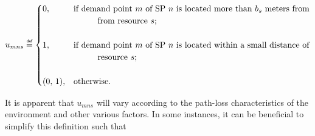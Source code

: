 \documentclass[12pt,dvipsnames]{report}
\newcommand\defeq{\mathrel{\overset{\makebox[0pt]{\mbox{\normalfont\tiny\sffamily def}}}{=}}}
\newcommand\tab[1][1cm]{\hspace*{#1}}
\begin{document}
\iftrue %
\begin{singlespacing}
\begin{equation} \label{eq:umns}
u_{mns} \defeq
	\begin{cases}
		0,& \text{if demand point $m$ of SP $n$ is located more than $b_s$ meters from}\\
		& \text{\tab from resource $s$;}\\
		\\
		1,& \text{if demand point $m$ of SP $n$ is located within a small distance of}\\
		& \text{\tab resource $s$;}\\
		\\
		(0,\, 1),& \text{otherwise.}
	\end{cases}
\end{equation}
\end{singlespacing}
\else
\begin{equation} \label{eq:umns}
u_{mns} \defeq
	\begin{cases}
		0,& \text{if demand point $m$ of SP $n$ is located more than $b_s$ meters from}\\
		& \text{\tab from resource $s$,}\\
		1,& \text{if demand point $m$ of SP $n$ is located within a small distance of}\\
		& \text{\tab resource $s$}\\
		(0,\, 1),& \text{otherwise.}
	\end{cases}
\end{equation}
\fi

It is apparent that $u_{mns}$ will vary according to the path-loss characteristics of the environment and other various factors.  In some instances, it can be beneficial to simplify this definition such that
\end{document}
